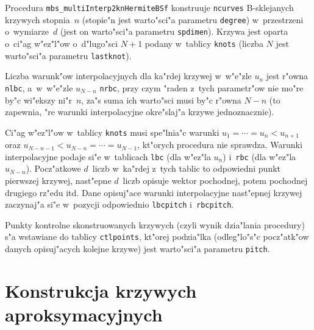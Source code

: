 \vspace{\bigskipamount}
\begin{sloppypar}
Procedura \texttt{mbs\_multiInterp2knHermiteBSf} konstruuje \texttt{ncurves}
\mbox{B-sklejanych} krzywych stopnia~$n$ (stopie"n jest warto"sci"a parametru
\texttt{degree}) w~przestrzeni o~wymiarze~$d$ (jest on warto"sci"a parametru
\texttt{spdimen}). Krzywa jest
oparta o~ci"ag w"ez\-"l"ow o~d"lugo"sci $N+1$ podany w~tablicy \texttt{knots}
(liczba $N$ jest warto"sci"a parametru \texttt{lastknot}).
\end{sloppypar}

Liczba warunk"ow interpolacyjnych dla ka"rdej krzywej
w~w"e"zle $u_n$ jest r"owna \texttt{nlbc}, a~w~w"e"zle $u_{N-n}$
\texttt{nrbc}, przy czym "raden z~tych parametr"ow nie
mo"re by"c wi"ekszy ni"r~$n$, za"s suma ich warto"sci musi by"c r"owna
$N-n$ (to zapewnia, "re warunki interpolacyjne okre"slaj"a krzywe
jednoznacznie).

Ci"ag w"ez"l"ow w~tablicy \texttt{knots} musi spe"lnia"c warunki
$u_1=\cdots=u_n<u_{n+1}$ oraz $u_{N-n-1}<u_{N-n}=\cdots=u_{N-1}$,
kt"orych procedura nie sprawdza. Warunki interpolacyjne podaje si"e
w~tablicach \texttt{lbc} (dla w"ez"la $u_n$) i~\texttt{rbc}
(dla w"ez"la $u_{N-n}$). Pocz"atkowe $d$~liczb w~ka"rdej z~tych tablic
to odpowiedni punkt pierwszej krzywej, nast"epne $d$~liczb opisuje
wektor pochodnej, potem pochodnej drugiego rz"edu itd.
Dane opisuj"ace warunki interpolacyjne nast"epnej krzywej zaczynaj"a si"e
w~pozycji odpowiednio \texttt{lbcpitch} i~\texttt{rbcpitch}.

Punkty kontrolne skonstruowanych krzywych (czyli wynik dzia"lania procedury)
s"a wstawiane do tablicy \texttt{ctlpoints}, kt"orej podzia"lka
(odleg"lo"s"c pocz"atk"ow danych opisuj"acych kolejne krzywe) jest
warto"sci"a parametru \texttt{pitch}.


\newpage
\section{Konstrukcja krzywych aproksymacyjnych}


